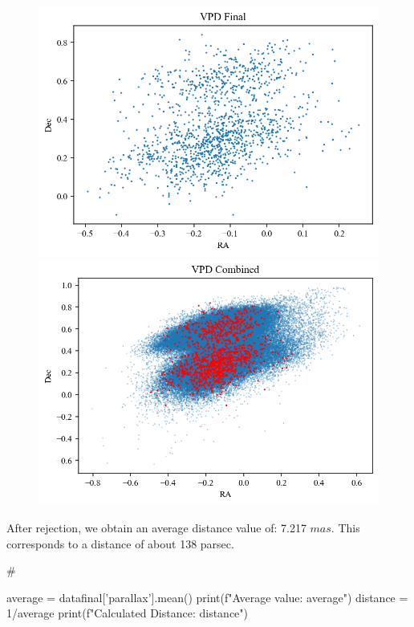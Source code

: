 \documentclass{article}
\begin{document}
\begin{figure}
    \includegraphics[scale = .5]{Figure 2025-02-08 230950 (9).png}
    \includegraphics[scale = .5]{Figure 2025-02-08 230950 (10).png}
\end{figure}

After rejection, we obtain an average distance value of:
7.217 $mas$. This corresponds to a distance of about 138 parsec.


\begin{python}
    #%

    average = datafinal['parallax'].mean()
    print(f"Average value: {average}")
    distance = 1/average
    print(f"Calculated Distance: {distance}")
\end{python}
\end{document}
